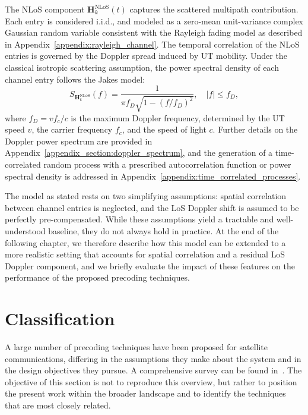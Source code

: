 The \ac{NLoS} component $\mathbf{H}_k^{\mathrm{NLoS}}(t)$ captures the scattered multipath contribution.
Each entry is considered \ac{i.i.d.}, and modeled as a zero-mean unit-variance complex Gaussian random variable consistent with the Rayleigh fading model as described in Appendix~\ref{appendix:rayleigh_channel}. 
The temporal correlation of the \ac{NLoS} entries is governed by the Doppler spread induced by \ac{UT} mobility.
Under the classical isotropic scattering assumption, the power spectral density of each channel entry follows the Jakes model:
\begin{equation}
\label{eq:jakes_doppler_spectrum}
    S_{\mathbf{H}_k^{\mathrm{NLoS}}}(f) = \frac{1}{\pi f_D \sqrt{1 - (f/f_D)^2}}, \quad |f| \leq f_D,
\end{equation}
where $f_D = v f_c / c$ is the maximum Doppler frequency, determined by the \ac{UT} speed $v$, the carrier frequency $f_c$, and the speed of light $c$. 
Further details on the Doppler power spectrum are provided in Appendix~\ref{appendix_section:doppler_spectrum}, and the generation of a time-correlated random process with a prescribed autocorrelation function or power spectral density is addressed in Appendix~\ref{appendix:time_correlated_processes}.

The model as stated rests on two simplifying assumptions: spatial correlation between channel entries is neglected, and the \ac{LoS} Doppler shift is assumed to be perfectly pre-compensated.
While these assumptions yield a tractable and well-understood baseline, they do not always hold in practice.
At the end of the following chapter, we therefore describe how this model can be extended to a more realistic setting that accounts for spatial correlation and a residual \ac{LoS} Doppler component, and we briefly evaluate the impact of these features on the performance of the proposed precoding techniques.


\section{Classification}
\label{section:hts_classification}

A large number of precoding techniques have been proposed for satellite communications, differing in the assumptions they make about the system and in the design objectives they pursue. A comprehensive survey can be found in~\cite{3_precoding_for_satellites_survey}. The objective of this section is not to reproduce this overview, but rather to position the present work within the broader landscape and to identify the techniques that are most closely related.

